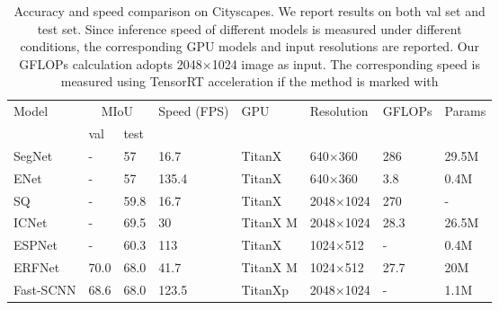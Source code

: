 \documentclass[journal]{IEEEtran}
\begin{document}
\begin{table*}[]
\caption{Accuracy and speed comparison on Cityscapes. We report results on both val set and test set. Since inference speed of different models is measured under different conditions, the corresponding GPU models and input resolutions are reported. Our GFLOPs calculation adopts 2048$\times$1024 image as input. The corresponding speed is measured using TensorRT acceleration if the method is marked with \dag}
\label{tab:1}
\begin{tabular}{p{80pt}p{43pt}<{\centering}p{43pt}<{\centering}p{50pt}<{\centering}p{50pt}<{\centering}p{50pt}<{\centering}p{50pt}<{\centering}p{50pt}<{\centering}}
\toprule
\multirow{2}{*}{Model} & \multicolumn{2}{c}{MIoU} & \multirow{2}{*}{Speed (FPS)} & \multirow{2}{*}{GPU} & \multirow{2}{*}{Resolution} & \multirow{2}{*}{GFLOPs} & \multirow{2}{*}{Params} \\ \cmidrule{2-3}
                       & val         & test       &                      &                      &                             &                         &                         \\ \midrule
SegNet\cite{badrinarayanan2017segnet}& -           & 57         & 16.7                 & TitanX               & 640$\times$360              & 286                        & 29.5M                   \\
ENet\cite{paszke2016enet}  & -           & 57         & 135.4                & TitanX               & 640$\times$360              & 3.8                        & 0.4M                    \\
SQ\cite{treml2016speeding} & -           & 59.8       & 16.7                 & TitanX               & 2048$\times$1024            & 270                        & -                       \\
ICNet\cite{zhao2018icnet}  & -           & 69.5       & 30                   & TitanX M             & 2048$\times$1024            & 28.3                       & 26.5M                   \\
ESPNet\cite{mehta2018espnet}& -           & 60.3       & 113                  & TitanX               & 1024$\times$512             & -                       & 0.4M                    \\
ERFNet\cite{romera2017erfnet}& 70.0        & 68.0       & 41.7                 & TitanX M             & 1024$\times$512             & 27.7                    & 20M                     \\ \midrule
Fast-SCNN\cite{poudel2019fast}& 68.6        & 68.0       & 123.5                & TitanXp              & 2048$\times$1024            & -                        & 1.1M                    \\

\end{tabular}
\end{table*}
\end{document}
